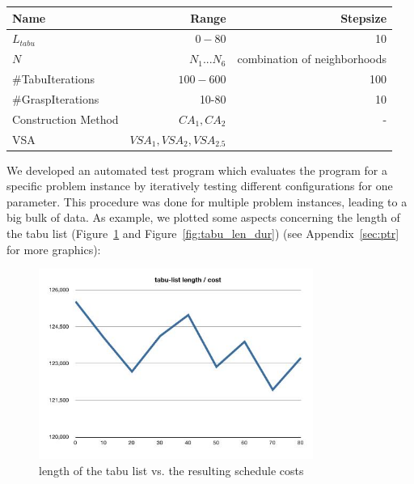 \documentclass[a4paper,11pt]{article}
\begin{document}
\begin{center}
\begin{tabular}{| l | r |r | }
  \hline
  Name & Range & Stepsize \\   \hline     \hline
  $L_{tabu}$ &  $0-80$& 10\\ \hline
  $N$ &  $N_1 ... N_6$ & combination of neighborhoods\\ \hline
  \#TabuIterations & $100-600$  & 100 \\ \hline
  \#GraspIterations &  10-80 & 10  \\ \hline
  Construction Method &  $CA_1, CA_2 $& - \\ \hline
  VSA & $ VSA_1, VSA_2, VSA_{2.5}$  & \\ \hline
\end{tabular}
\end{center}

We developed an automated test program which evaluates the program for a specific problem instance
by iteratively testing different configurations for one parameter. This procedure was done for multiple problem instances, leading to a big bulk of data.
As example, we plotted some aspects concerning the length of the tabu list (Figure~\ref{fig:tabu_len_cost} and Figure~\ref{fig:tabu_len_dur})
(see Appendix~\ref{sec:ptr} for more graphics):

\begin{figure}[htb]
  \begin{center}
    \includegraphics[width=0.8\textwidth]{images/tabulist-len-cost}
  \end{center}
  \caption{length of the tabu list vs. the resulting schedule costs}
  \label{fig:tabu_len_cost}
\end{figure}
\end{document}
